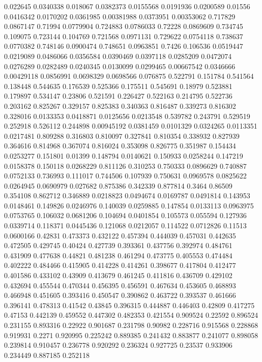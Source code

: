 0.022645 0.0340338
0.018067 0.0382373
0.0155568 0.0191936
0.0200589 0.01556
0.0416342 0.0170202
0.0361985 0.00381988
0.0373951 0.00353062
0.717829 0.0867147
0.71994 0.0779904
0.724883 0.0786033
0.72228 0.0869609
0.734745 0.109075
0.723144 0.104769
0.721568 0.0971131
0.729622 0.0754118
0.738637 0.0770382
0.748146 0.0900474
0.748651 0.0963851
0.7426 0.106536
0.0519447 0.0219089
0.0486066 0.0356584
0.0390469 0.0397118
0.0285209 0.0472074
0.0276289 0.0282489
0.0240345 0.0130099
0.0299465 0.00667542
0.0346666 0.00429118
0.0856991 0.0698329
0.0698566 0.076875
0.522791 0.151784
0.541564 0.138448
0.544635 0.176539
0.525366 0.175511
0.545691 0.18979
0.523881 0.179897
0.534147 0.23806
0.521591 0.226427
0.522163 0.214795
0.522736 0.203162
0.825267 0.329157
0.825383 0.340363
0.816487 0.339273
0.816302 0.328016
0.0133353 0.0418871
0.0125656 0.0213548
0.539782 0.243791
0.529519 0.252918
0.526112 0.244898
0.00945192 0.0381459
0.0101329 0.0324265
0.0113351 0.0217481
0.809288 0.316803
0.810097 0.327841
0.810354 0.338932
0.827939 0.364616
0.814968 0.367074
0.816024 0.353098
0.826775 0.351987
0.154434 0.0253277
0.151801 0.01399
0.148794 0.0140621
0.150933 0.0258244
0.147219 0.0158378
0.150118 0.0268229
0.811126 0.310253
0.750333 0.0896629
0.740887 0.0752133
0.736993 0.111017
0.744506 0.107939
0.750631 0.0969578
0.0825622 0.0264945
0.0690979 0.027682
0.875386 0.342339
0.877814 0.3464
0.86509 0.354108
0.862712 0.346889
0.0218823 0.0494674
0.0169787 0.0491814
0.143953 0.0148461
0.149826 0.0246976
0.140039 0.0259885
0.147854 0.0133113
0.0963975 0.0753765
0.106032 0.0681206
0.104694 0.0401854
0.105573 0.055594
0.127936 0.0339714
0.118371 0.0445436
0.121068 0.0212057
0.114522 0.0712826
0.11513 0.0600166
0.42831 0.473373
0.432122 0.457394
0.444039 0.457031
0.442635 0.472505
0.429745 0.40424
0.427739 0.393361
0.437756 0.392974
0.484761 0.431909
0.477638 0.44821
0.481238 0.461294
0.473775 0.405553
0.474484 0.402222
0.484466 0.415905
0.414228 0.414261
0.398677 0.417804
0.412477 0.401586
0.433102 0.43909
0.413679 0.461245
0.411816 0.436709
0.429102 0.432694
0.455544 0.470344
0.456395 0.456591
0.467634 0.453605
0.468893 0.466948
0.451605 0.393416
0.450547 0.390862
0.463722 0.393537
0.461666 0.396141
0.478313 0.41542
0.43845 0.396315
0.444887 0.446403
0.42809 0.417275
0.47153 0.442139
0.459552 0.447302
0.482353 0.421554
0.909524 0.22592
0.896524 0.231155
0.893316 0.22922
0.901687 0.231798
0.90982 0.228716
0.915568 0.228868
0.919931 0.2271
0.920995 0.225242
0.889385 0.241432
0.883877 0.241077
0.898058 0.239814
0.910457 0.236778
0.920292 0.236324
0.927725 0.23537
0.933906 0.234449
0.887185 0.252118
